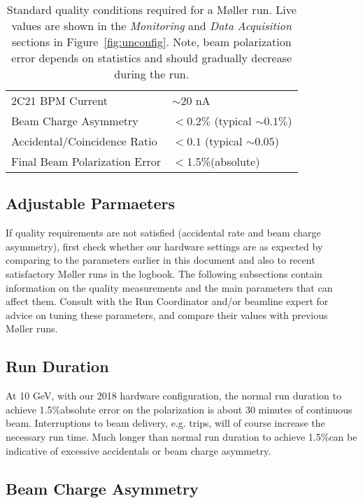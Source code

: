 \documentclass[amsmath,amssymb,notitlepage,12pt]{revtex4}
\newcommand{\ibeam}{20 nA\ }
\newcommand{\easy}{1.5\%}
\begin{document}
\begin{table}[htbp]\centering
    \begin{tabular}{ll}\toprule[1.5pt]
        2C21 BPM Current & $\sim$\ibeam\\
        Beam Charge Asymmetry & $<0.2\%$ (typical $\sim 0.1\%$)\\
        Accidental/Coincidence Ratio & $<0.1$ (typical $\sim 0.05$)\\
        Final Beam Polarization Error & $<$\easy (absolute)\\
        \bottomrule[1.5pt]
    \end{tabular}
    \caption{Standard quality conditions required for a M{\o}ller run.  Live values are shown in the {\em Monitoring} and {\em Data Acquisition} sections in Figure~\ref{fig:unconfig}.  Note, beam polarization error depends on statistics and should gradually decrease during the run.\label{tab:reqs}}
\end{table}

\subsection{Adjustable Parmaeters}\label{sec:knobs}

If quality requirements are not satisfied (accidental rate and beam charge asymmetry), first check whether our hardware settings are as expected by comparing to the parameters earlier in this document and also to recent satisfactory M{\o}ller runs in the logbook.  The following subsections contain information on the quality measurements and the main parameters that can affect them.  Consult with the Run Coordinator and/or beamline expert for advice on tuning these parameters, and compare their values with previous M{\o}ller runs.

\subsection{Run Duration}

At 10 GeV, with our 2018 hardware configuration, the normal run duration to achieve \easy absolute error on the polarization is about 30 minutes of continuous beam.  Interruptions to beam delivery, e.g. trips, will of course increase the necessary run time.  Much longer than normal run duration to achieve \easy can be indicative of excessive accidentals or beam charge asymmetry.

\subsection{Beam Charge Asymmetry}
\end{document}
